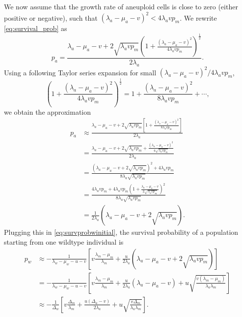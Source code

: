 \documentclass[12pt]{extarticle}
\begin{document}
\begin{appendices}
We now assume that the growth rate of aneuploid cells is close to zero (either positive or negative), such that  $\left(\lambda_a-\mu_a-v\right)^2 < 4\lambda_avp_m$.
We rewrite \cref{eq:survival_prob} as
\begin{equation}
p_a = \frac{\lambda_a-\mu_a-v+2\sqrt{\lambda_a vp_m}\left(1+\frac{\left(\lambda_a-\mu_a-v\right)^2}{4\lambda_avp_m}\right)^{\frac12}}{2\lambda_a} .
\end{equation}
Using a following Taylor series expansion for small $\left(\lambda_a-\mu_a-v\right)^2 / 4\lambda_avp_m$,
\begin{equation*}
\left(1+\frac{\left(\lambda_a-\mu_a-v\right)^2}{4\lambda_avp_m}\right)^{\frac{1}{2}}=1+\frac{\left(\lambda_a-\mu_a-v\right)^2}{8\lambda_avp_m}+\cdots,
\end{equation*}
we obtain the approximation
\begin{equation}
\begin{aligned}
p_a&\approx\frac{\lambda_a-\mu_a-v+2\sqrt{\lambda_a vp_m}\left[1+\frac{\left(\lambda_a-\mu_a-v\right)^2}{8\lambda_avp_m}\right]}{2\lambda_a}\\
&=\frac{\lambda_a-\mu_a-v+2\sqrt{\lambda_a vp_m}+\frac{\left(\lambda_a-\mu_a-v\right)^2}{4\sqrt{\lambda_avp_m}}}{2\lambda_a}\\
&=\frac{\left(\lambda_a-\mu_a-v+2\sqrt{\lambda_avp_m}\right)^2+4\lambda_avp_m}{8\lambda_a\sqrt{\lambda_avp_m}}\\
&=\frac{4\lambda_avp_m+4\lambda_avp_m\left(1+\frac{\lambda_a-\mu_a-v}{2\sqrt{\lambda_avp_m}}\right)^2}{8\lambda_a\sqrt{\lambda_avp_m}}\\
&=\frac{1}{2\lambda_a}\left(\lambda_a-\mu_a-v+2\sqrt{\lambda_avp_m}\right).
\end{aligned}
\end{equation}
Plugging this in \cref{eq:survprobwinitial}, the survival probability of a population starting from one wildtype individual is
\begin{equation}\label{eq:scenario3}
\begin{aligned}
p_w&\approx-\frac{1}{\lambda_w-\mu_w-u-v}\left[v\frac{\lambda_m-\mu_m}{\lambda_m}+\frac{u}{2\lambda_a}\left(\lambda_a-\mu_a-v+2\sqrt{\lambda_avp_m}\right)\right]\\
&=-\frac{1}{\lambda_w-\mu_w-u-v}\left[v\frac{\lambda_m-\mu_m}{\lambda_m}+\frac{u}{2\lambda_a}\left(\lambda_a-\mu_a-v\right)+u\sqrt{\frac{v\left(\lambda_m-\mu_m\right)}{\lambda_a\lambda_m}}\right]\\
&\approx-\frac{1}{\Delta_w}\left[v\frac{\Delta_m}{\lambda_m}+\frac{u\left(\Delta_a-v\right)}{2\lambda_a}+u\sqrt{\frac{v\Delta_m}{\lambda_a\lambda_m}}\right].

\end{aligned}
\end{equation}
\end{appendices}
\end{document}

